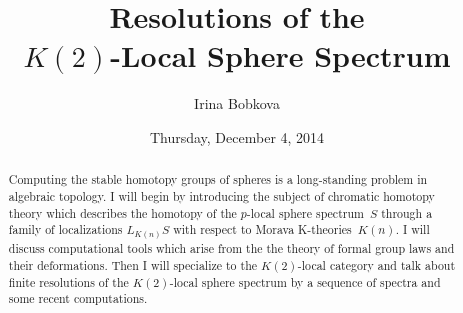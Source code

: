 \documentclass{UAmathtalk}
\author{Irina Bobkova}
\title{Resolutions of the\\ $K(2)$-Local Sphere Spectrum}
\date{Thursday, December 4, 2014}
\begin{document}
\maketitle

\begin{abstract}
Computing the stable homotopy groups of spheres is a long-standing problem in algebraic topology. I will begin by introducing the subject of chromatic homotopy theory which describes the homotopy of the $p$-local sphere spectrum~$S$ through a family of localizations $L_{K(n)}S$ with respect to Morava K-theories~$K(n)$. I will discuss computational tools which arise from the the theory of formal group laws and their deformations. Then I will specialize to the $K(2)$-local category and talk about finite resolutions of the $K(2)$-local sphere spectrum by a sequence of spectra and some recent computations.
\end{abstract}
\end{document}
